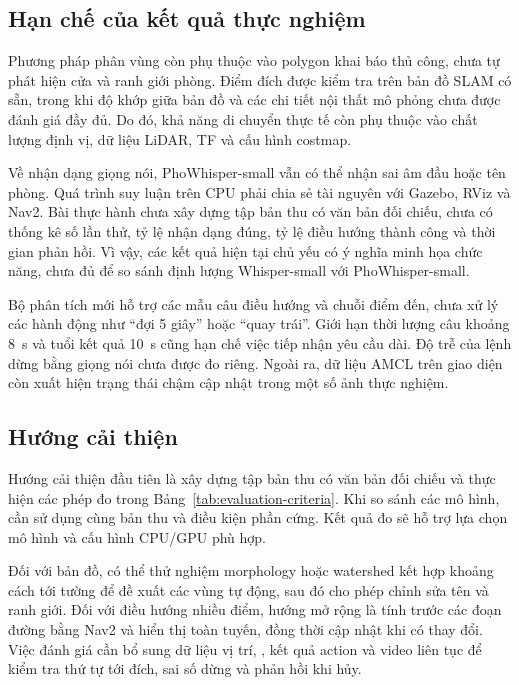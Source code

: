 \documentclass[13pt,a4paper]{extarticle}
\newcommand{\code}[1]{%
    \path{#1}%
}
\begin{document}
\subsection{Hạn chế của kết quả thực nghiệm}

Phương pháp phân vùng còn phụ thuộc vào polygon khai báo thủ công, chưa tự phát hiện cửa và ranh giới phòng. Điểm đích được kiểm tra trên bản đồ SLAM có sẵn, trong khi độ khớp giữa bản đồ và các chi tiết nội thất mô phỏng chưa được đánh giá đầy đủ. Do đó, khả năng di chuyển thực tế còn phụ thuộc vào chất lượng định vị, dữ liệu LiDAR, TF và cấu hình costmap.

Về nhận dạng giọng nói, PhoWhisper-small vẫn có thể nhận sai âm đầu hoặc tên phòng. Quá trình suy luận trên CPU phải chia sẻ tài nguyên với Gazebo, RViz và Nav2. Bài thực hành chưa xây dựng tập bản thu có văn bản đối chiếu, chưa có thống kê số lần thử, tỷ lệ nhận dạng đúng, tỷ lệ điều hướng thành công và thời gian phản hồi. Vì vậy, các kết quả hiện tại chủ yếu có ý nghĩa minh họa chức năng, chưa đủ để so sánh định lượng Whisper-small với PhoWhisper-small.

Bộ phân tích mới hỗ trợ các mẫu câu điều hướng và chuỗi điểm đến, chưa xử lý các hành động như ``đợi 5 giây'' hoặc ``quay trái''. Giới hạn thời lượng câu khoảng 8~s và tuổi kết quả 10~s cũng hạn chế việc tiếp nhận yêu cầu dài. Độ trễ của lệnh dừng bằng giọng nói chưa được đo riêng. Ngoài ra, dữ liệu AMCL trên giao diện còn xuất hiện trạng thái chậm cập nhật trong một số ảnh thực nghiệm.

\subsection{Hướng cải thiện}

Hướng cải thiện đầu tiên là xây dựng tập bản thu có văn bản đối chiếu và thực hiện các phép đo trong Bảng~\ref{tab:evaluation-criteria}. Khi so sánh các mô hình, cần sử dụng cùng bản thu và điều kiện phần cứng. Kết quả đo sẽ hỗ trợ lựa chọn mô hình và cấu hình CPU/GPU phù hợp.

Đối với bản đồ, có thể thử nghiệm morphology hoặc watershed kết hợp khoảng cách tới tường để đề xuất các vùng tự động, sau đó cho phép chỉnh sửa tên và ranh giới. Đối với điều hướng nhiều điểm, hướng mở rộng là tính trước các đoạn đường bằng Nav2 và hiển thị toàn tuyến, đồng thời cập nhật khi có thay đổi. Việc đánh giá cần bổ sung dữ liệu vị trí, \code{/plan}, kết quả action và video liên tục để kiểm tra thứ tự tới đích, sai số dừng và phản hồi khi hủy.
\end{document}
